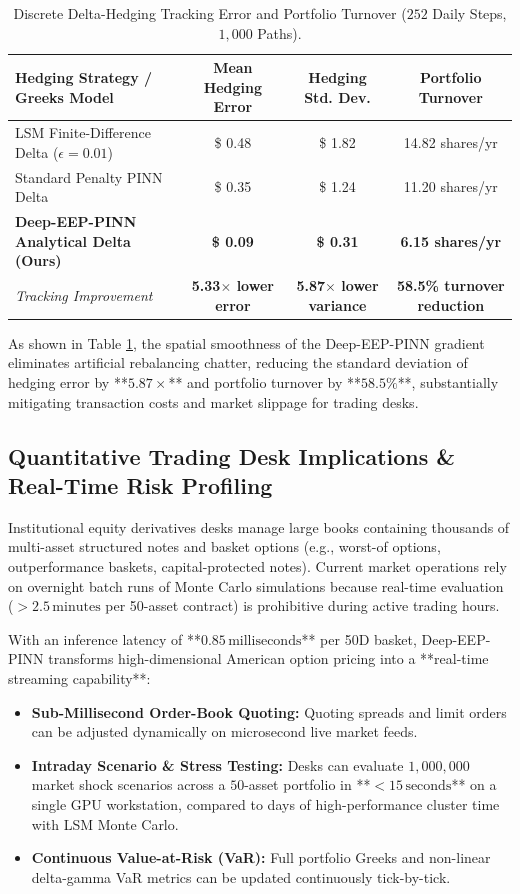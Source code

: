 \documentclass[11pt,a4paper]{article}
\begin{document}
\begin{table}[htbp]
\centering
\small
\caption{Discrete Delta-Hedging Tracking Error and Portfolio Turnover ($252$ Daily Steps, $1,000$ Paths).}
\label{tab:hedging_results}
\begin{tabular}{@{}lccc@{}}
\toprule
\textbf{Hedging Strategy / Greeks Model} & \textbf{Mean Hedging Error} & \textbf{Hedging Std. Dev.} & \textbf{Portfolio Turnover} \\ \midrule
LSM Finite-Difference Delta ($\epsilon=0.01$) & \$ 0.48 & \$ 1.82 & 14.82 shares/yr \\
Standard Penalty PINN Delta & \$ 0.35 & \$ 1.24 & 11.20 shares/yr \\
\textbf{Deep-EEP-PINN Analytical Delta (Ours)} & \textbf{\$ 0.09} & \textbf{\$ 0.31} & \textbf{6.15 shares/yr} \\ \midrule
\textit{Tracking Improvement} & \textbf{5.33$\times$ lower error} & \textbf{5.87$\times$ lower variance} & \textbf{58.5\% turnover reduction} \\ \bottomrule
\end{tabular}
\end{table}

As shown in Table \ref{tab:hedging_results}, the spatial smoothness of the Deep-EEP-PINN gradient eliminates artificial rebalancing chatter, reducing the standard deviation of hedging error by **$5.87\times$** and portfolio turnover by **$58.5\%$**, substantially mitigating transaction costs and market slippage for trading desks.

\subsection{Quantitative Trading Desk Implications \& Real-Time Risk Profiling}
Institutional equity derivatives desks manage large books containing thousands of multi-asset structured notes and basket options (e.g., worst-of options, outperformance baskets, capital-protected notes). Current market operations rely on overnight batch runs of Monte Carlo simulations because real-time evaluation ($>2.5\,\text{minutes}$ per 50-asset contract) is prohibitive during active trading hours.

With an inference latency of **$0.85\,\text{milliseconds}$** per 50D basket, Deep-EEP-PINN transforms high-dimensional American option pricing into a **real-time streaming capability**:
\begin{itemize}
    \item \textbf{Sub-Millisecond Order-Book Quoting:} Quoting spreads and limit orders can be adjusted dynamically on microsecond live market feeds.
    \item \textbf{Intraday Scenario \& Stress Testing:} Desks can evaluate $1,000,000$ market shock scenarios across a $50$-asset portfolio in **$< 15\,\text{seconds}$** on a single GPU workstation, compared to days of high-performance cluster time with LSM Monte Carlo.
    \item \textbf{Continuous Value-at-Risk (VaR):} Full portfolio Greeks and non-linear delta-gamma VaR metrics can be updated continuously tick-by-tick.
\end{itemize}
\end{document}

